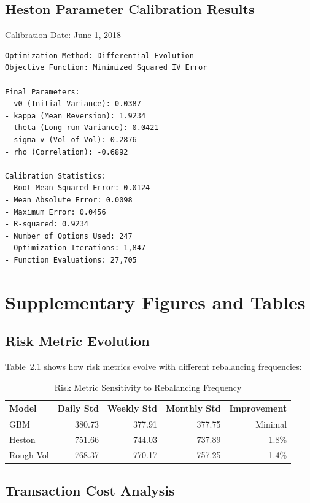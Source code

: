 \documentclass[12pt,a4paper]{report}
\begin{document}
\section{Heston Parameter Calibration Results}

Calibration Date: June 1, 2018

\begin{verbatim}
Optimization Method: Differential Evolution
Objective Function: Minimized Squared IV Error

Final Parameters:
- v0 (Initial Variance): 0.0387
- kappa (Mean Reversion): 1.9234
- theta (Long-run Variance): 0.0421
- sigma_v (Vol of Vol): 0.2876
- rho (Correlation): -0.6892

Calibration Statistics:
- Root Mean Squared Error: 0.0124
- Mean Absolute Error: 0.0098
- Maximum Error: 0.0456
- R-squared: 0.9234
- Number of Options Used: 247
- Optimization Iterations: 1,847
- Function Evaluations: 27,705
\end{verbatim}

\chapter{Supplementary Figures and Tables}

\section{Risk Metric Evolution}

Table~\ref{tab:risk_evolution} shows how risk metrics evolve with different rebalancing frequencies:

\begin{table}[H]
\centering
\caption{Risk Metric Sensitivity to Rebalancing Frequency}
\label{tab:risk_evolution}
\begin{tabular}{lrrrr}
\toprule
Model & Daily Std & Weekly Std & Monthly Std & Improvement \\
\midrule
GBM & 380.73 & 377.91 & 377.75 & Minimal \\
Heston & 751.66 & 744.03 & 737.89 & 1.8\% \\
Rough Vol & 768.37 & 770.17 & 757.25 & 1.4\% \\
\bottomrule
\end{tabular}
\end{table}

\section{Transaction Cost Analysis}
\end{document}
